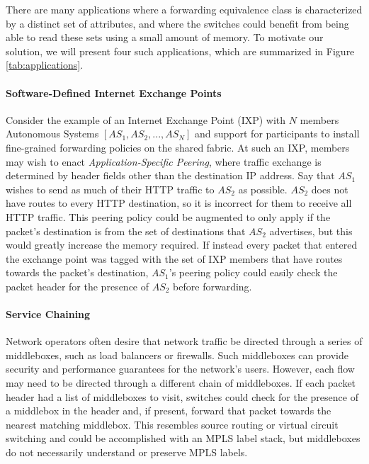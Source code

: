 There are many applications where a forwarding equivalence class is
characterized by a distinct set of attributes, and where the switches could
benefit from being able to read these sets using a small amount of memory. To
motivate our solution, we will present four such applications, which are
summarized in Figure \ref{tab:applications}.
 
\paragraph{Software-Defined Internet Exchange Points} Consider the example of an
Internet Exchange Point (IXP) with $N$ members Autonomous Systems $[AS_1, AS_2,
..., AS_N]$ and support for participants to install fine-grained forwarding
policies on the shared fabric. At such an IXP, members may wish to enact
\textit{Application-Specific Peering}, where traffic exchange is determined by
header fields other than the destination IP address. Say that $AS_1$ wishes to
send as much of their HTTP traffic to $AS_2$ as possible. $AS_2$ does not have
routes to every HTTP destination, so it is incorrect for them to receive all
HTTP traffic. This peering policy could be augmented to only apply if the
packet's destination is from the set of destinations that $AS_2$ advertises, but
this would greatly increase the memory required. If instead every packet that
entered the exchange point was tagged with the set of IXP members that have
routes towards the packet's destination, $AS_1$'s peering policy could easily
check the packet header for the presence of $AS_2$ before forwarding.

\paragraph{Service Chaining} Network operators often desire that network traffic
be directed through a series of middleboxes, such as load balancers or
firewalls. Such middleboxes can provide security and performance guarantees for
the network's users.  However, each flow may need to be directed through a
different chain of middleboxes. If each packet header had a list of middleboxes
to visit, switches could check for the presence of a middlebox in the header
and, if present, forward that packet towards the nearest matching middlebox.
This resembles source routing or virtual circuit switching and could be
accomplished with an MPLS label stack, but middleboxes do not necessarily
understand or preserve MPLS labels. 

